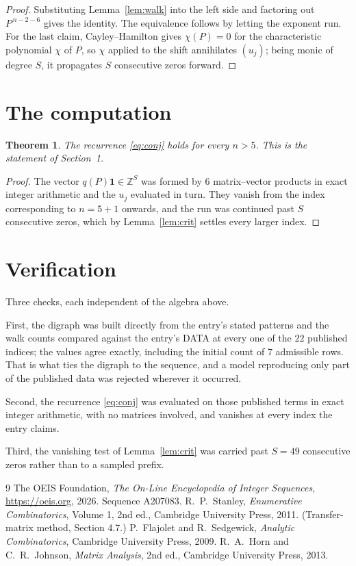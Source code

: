 \documentclass[11pt,a4paper]{article}
\theoremstyle{plain}
\newtheorem{theorem}{Theorem}
\theoremstyle{definition}
\begin{document}
\begin{proof}
Substituting Lemma~\ref{lem:walk} into the left side and factoring out
$P^{\,n-2-6}$ gives the identity. The equivalence follows by letting the exponent
run. For the last claim, Cayley--Hamilton gives $\chi(P)=0$ for the characteristic
polynomial $\chi$ of $P$, so $\chi$ applied to the shift annihilates $(u_j)$; being monic of
degree $S$, it propagates $S$ consecutive zeros forward.
\end{proof}

\section{The computation}

\begin{theorem}
The recurrence \eqref{eq:conj} holds for every $n>5$. This is the statement of
Section~1.
\end{theorem}

\begin{proof}
The vector $q(P)\mathbf{1}\in\mathbb{Z}^{S}$ was formed by $6$ matrix--vector
products in exact integer arithmetic and the $u_j$ evaluated in turn. They vanish from the
index corresponding to $n=5+1$ onwards, and the run was continued past $S$ consecutive
zeros, which by Lemma~\ref{lem:crit} settles every larger index.
\end{proof}

\section{Verification}

Three checks, each independent of the algebra above.

First, the digraph was built directly from the entry's stated patterns and the walk counts
compared against the entry's DATA at every one of the $22$ published indices; the
values agree exactly, including the initial count of $7$ admissible rows. That is
what ties the digraph to the sequence, and a model reproducing only part of the published
data was rejected wherever it occurred.

Second, the recurrence \eqref{eq:conj} was evaluated on those published terms in exact
integer arithmetic, with no matrices involved, and vanishes at every index the entry claims.

Third, the vanishing test of Lemma~\ref{lem:crit} was carried past $S=49$ consecutive
zeros rather than to a sampled prefix.

\begin{thebibliography}{9}
 The OEIS Foundation, \emph{The On-Line Encyclopedia of Integer
Sequences}, \url{https://oeis.org}, 2026. Sequence A207083.
 R.~P.~Stanley, \emph{Enumerative Combinatorics}, Volume 1, 2nd ed.,
Cambridge University Press, 2011. (Transfer-matrix method, Section 4.7.)
 P.~Flajolet and R.~Sedgewick, \emph{Analytic Combinatorics}, Cambridge
University Press, 2009.
 R.~A.~Horn and C.~R.~Johnson, \emph{Matrix Analysis}, 2nd ed., Cambridge
University Press, 2013.
\end{thebibliography}
\end{document}
